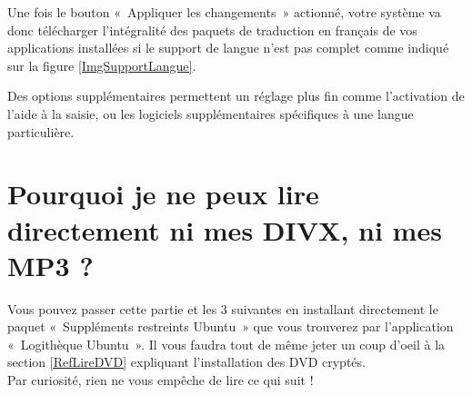 Une fois le bouton «~Appliquer les changements~» actionné, votre système va donc télécharger l'intégralité des paquets de traduction en français de vos applications installées si le support de langue n'est pas complet comme indiqué sur la figure \ref{ImgSupportLangue}.\par
Des options supplémentaires permettent un réglage plus fin comme l'activation de l'aide à la saisie, ou les logiciels supplémentaires spécifiques à une langue particulière.\par
{}
\section{Pourquoi je ne peux lire directement ni mes DIVX, ni mes MP3 ?}
Vous pouvez passer cette partie et les 3 suivantes en installant directement le paquet «~Suppléments restreints Ubuntu~» que vous trouverez par l'application «~Logithèque Ubuntu~». Il vous faudra tout de même jeter un coup d'oeil à la section \ref{RefLireDVD} expliquant l'installation des DVD cryptés.\\
Par curiosité, rien ne vous empêche de lire ce qui suit !
